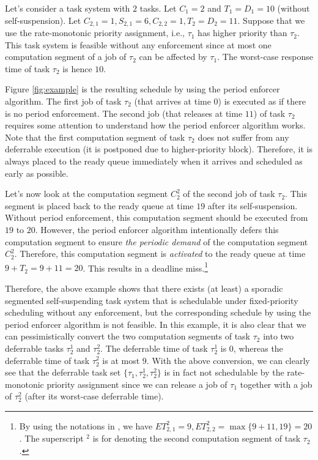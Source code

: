 Let's consider a task system with $2$ tasks. Let $C_1 = 2$ and $T_1=D_1=10$ (without self-suspension). Let $C_{2,1} = 1, S_{2,1} = 6, C_{2,2}=1, T_2=D_2=11$. Suppose that we use the rate-monotonic priority assignment, i.e., $\tau_1$ has higher priority than $\tau_2$. This task system is feasible without any enforcement since at most one computation segment of a job of $\tau_2$ can be affected by $\tau_1$. The worst-case response time of task $\tau_2$ is hence $10$. 

Figure \ref{fig:example} is the resulting schedule by using the period enforcer algorithm. The first job of task $\tau_2$ (that arrives at time $0$) is executed as if there is no period enforcement. The second job (that releases at time $11$) of task $\tau_2$ requires some attention to understand how the period enforcer algorithm works. Note that the first computation segment of task $\tau_2$ does not suffer from any deferrable execution (it is postponed due to higher-priority block). Therefore, it is always placed to the ready queue immediately when it arrives and scheduled as early as possible.

Let's now look at the computation segment $C_2^2$ of the second job of task $\tau_2$. This segment is placed back to the ready queue at time $19$ after its self-suspension. Without period enforcement, this computation segment should be executed from $19$ to $20$. However, the period enforcer algorithm intentionally defers this computation segment to ensure \emph{the periodic demand} of the computation segment $C_2^2$. Therefore, this computation segment is \emph{activated} to the ready queue at time $9+T_2=9+11=20$. This results in a deadline miss.\footnote{By using the notations in \cite{Raj:suspension1991}, we have $ET_{2,1}^2=9, ET_{2,2}^2 = \max\{9+11, 19\}=20$. The superscript $^2$ is for denoting the second computation segment of task $\tau_2$.}

Therefore, the above example shows that there exists (at least) a sporadic segmented self-suspending task system that is schedulable under fixed-priority scheduling without any enforcement, but the corresponding schedule by using the period enforcer algorithm is not feasible. In this example, it is also clear that we can pessimistically convert the two computation segments of task $\tau_2$ into two deferrable tasks $\tau_2^1$ and $\tau_2^2$. The deferrable time of task $\tau_2^1$ is $0$, whereas the deferrable time of task $\tau_2^2$ is at most \emph{$9$}. With the above conversion, we can clearly see that the deferrable task set $\{\tau_1, \tau_2^1, \tau_2^2\}$ is in fact not schedulable by the rate-monotonic priority assignment since we can release a job of $\tau_1$ together with a job of $\tau_2^2$ (after its worst-case deferrable time).

